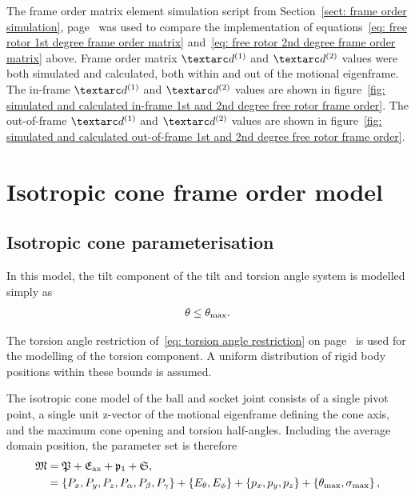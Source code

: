 
The frame order matrix element simulation script from Section~\ref{sect: frame order simulation}, page~\pageref{sect: frame order simulation} was used to compare the implementation of equations~\ref{eq: free rotor 1st degree frame order matrix} and~\ref{eq: free rotor 2nd degree frame order matrix} above.
Frame order matrix $\FOone$ and $\FOtwo$ values were both simulated and calculated, both within and out of the motional eigenframe.
The in-frame $\FOone$ and $\FOtwo$ values are shown in figure~\ref{fig: simulated and calculated in-frame 1st and 2nd degree free rotor frame order}.
The out-of-frame $\FOone$ and $\FOtwo$ values are shown in figure~\ref{fig: simulated and calculated out-of-frame 1st and 2nd degree free rotor frame order}.



\section{Isotropic cone frame order model}






\subsection{Isotropic cone parameterisation}

In this model, the tilt component of the tilt and torsion angle system is modelled simply as
\begin{equation}
    \theta \le \theta_\textrm{max} .
\end{equation}

The torsion angle restriction of~\ref{eq: torsion angle restriction} on page~\pageref{eq: torsion angle restriction} is used for the modelling of the torsion component.
A uniform distribution of rigid body positions within these bounds is assumed.

The isotropic cone model of the ball and socket joint consists of a single pivot point, a single unit z-vector of the motional eigenframe defining the cone axis, and the maximum cone opening and torsion half-angles.
Including the average domain position, the parameter set is therefore
\begin{subequations}
\begin{align}
    \mathfrak{M} &= \mathfrak{P} + \mathfrak{E}_\textrm{ax} + \mathfrak{p}_1 + \mathfrak{S}, \\
              &= \left\{ P_x, P_y, P_z, P_\alpha, P_\beta, P_\gamma \right\} + \left\{ E_\theta, E_\phi \right\} + \left\{ p_x, p_y, p_z \right\} + \left\{ \theta_\textrm{max}, \sigma_\textrm{max} \right\} ,
\end{align}
\end{subequations}

